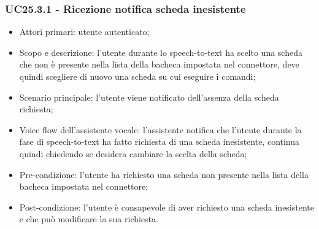 \subsubsection{UC25.3.1 - Ricezione notifica scheda inesistente}
\begin{itemize}
	\item  Attori primari: utente autenticato;
	\item  Scopo e descrizione: l'utente durante lo speech-to-text ha scelto una scheda che non è presente nella lista della bacheca impostata nel connettore, deve quindi scegliere di nuovo una scheda su cui eseguire i comandi;
	\item  Scenario principale: l'utente viene notificato dell'assenza della scheda richiesta;
	\item  Voice flow dell'assistente vocale: l'assistente notifica che l'utente durante la fase di speech-to-text ha fatto richiesta di una scheda inesistente, continua quindi chiedendo se desidera cambiare la scelta della scheda;
	\item  Pre-condizione: l'utente ha richiesto una scheda non presente nella lista della bacheca impostata nel connettore;
	\item  Post-condizione: l'utente è consapevole di aver richiesto una scheda inesistente e che può modificare la sua richiesta.
\end{itemize}
